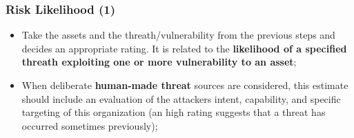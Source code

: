 \documentclass[xcolor ={table,usenames,dvipsnames}]{beamer}
\theoremstyle{definition}
\begin{document}
	\begin{frame}
		\frametitle{Risk Likelihood (1)}
		\begin{itemize}
			\item Take the assets and the threath/vulnerability from the previous steps and decides an appropriate rating. It is related to the \textbf{likelihood of a specified threath exploiting one or more vulnerability to an asset};
			\item When deliberate \textbf{human-made threat} sources are considered, this
			estimate should include an evaluation of the attackers intent, capability, and specific targeting of this organization (an high rating suggests that a threat has occurred sometimes previously);
		\end{itemize}
	\end{frame}
\end{document}

